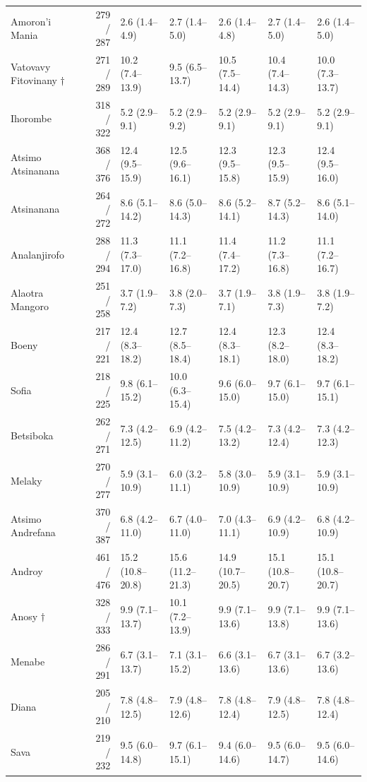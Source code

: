 \documentclass[11pt,a4paper]{article}
\begin{document}
\begin{landscape}
\begin{longtable}{l|rlllll}
Amoron'i Mania & 279 / 287 & 2.6 (1.4–4.9) & 2.7 (1.4–5.0) & 2.6 (1.4–4.8) & 2.7 (1.4–5.0) & 2.6 (1.4–5.0) \\ 
Vatovavy Fitovinany $\dagger$ & 271 / 289 & 10.2 (7.4–13.9) & 9.5 (6.5–13.7) & 10.5 (7.5–14.4) & 10.4 (7.4–14.3) & 10.0 (7.3–13.7) \\ 
Ihorombe & 318 / 322 & 5.2 (2.9–9.1) & 5.2 (2.9–9.2) & 5.2 (2.9–9.1) & 5.2 (2.9–9.1) & 5.2 (2.9–9.1) \\ 
Atsimo Atsinanana & 368 / 376 & 12.4 (9.5–15.9) & 12.5 (9.6–16.1) & 12.3 (9.5–15.8) & 12.3 (9.5–15.9) & 12.4 (9.5–16.0) \\ 
Atsinanana & 264 / 272 & 8.6 (5.1–14.2) & 8.6 (5.0–14.3) & 8.6 (5.2–14.1) & 8.7 (5.2–14.3) & 8.6 (5.1–14.0) \\ 
Analanjirofo & 288 / 294 & 11.3 (7.3–17.0) & 11.1 (7.2–16.8) & 11.4 (7.4–17.2) & 11.2 (7.3–16.8) & 11.1 (7.2–16.7) \\ 
Alaotra Mangoro & 251 / 258 & 3.7 (1.9–7.2) & 3.8 (2.0–7.3) & 3.7 (1.9–7.1) & 3.8 (1.9–7.3) & 3.8 (1.9–7.2) \\ 
Boeny & 217 / 221 & 12.4 (8.3–18.2) & 12.7 (8.5–18.4) & 12.4 (8.3–18.1) & 12.3 (8.2–18.0) & 12.4 (8.3–18.2) \\ 
Sofia & 218 / 225 & 9.8 (6.1–15.2) & 10.0 (6.3–15.4) & 9.6 (6.0–15.0) & 9.7 (6.1–15.0) & 9.7 (6.1–15.1) \\ 
Betsiboka & 262 / 271 & 7.3 (4.2–12.5) & 6.9 (4.2–11.2) & 7.5 (4.2–13.2) & 7.3 (4.2–12.4) & 7.3 (4.2–12.3) \\ 
Melaky & 270 / 277 & 5.9 (3.1–10.9) & 6.0 (3.2–11.1) & 5.8 (3.0–10.9) & 5.9 (3.1–10.9) & 5.9 (3.1–10.9) \\ 
Atsimo Andrefana & 370 / 387 & 6.8 (4.2–11.0) & 6.7 (4.0–11.0) & 7.0 (4.3–11.1) & 6.9 (4.2–10.9) & 6.8 (4.2–10.9) \\ 
Androy & 461 / 476 & 15.2 (10.8–20.8) & 15.6 (11.2–21.3) & 14.9 (10.7–20.5) & 15.1 (10.8–20.7) & 15.1 (10.8–20.7) \\ 
Anosy $\dagger$ & 328 / 333 & 9.9 (7.1–13.7) & 10.1 (7.2–13.9) & 9.9 (7.1–13.6) & 9.9 (7.1–13.8) & 9.9 (7.1–13.6) \\ 
Menabe & 286 / 291 & 6.7 (3.1–13.7) & 7.1 (3.1–15.2) & 6.6 (3.1–13.6) & 6.7 (3.1–13.6) & 6.7 (3.2–13.6) \\ 
Diana & 205 / 210 & 7.8 (4.8–12.5) & 7.9 (4.8–12.6) & 7.8 (4.8–12.4) & 7.9 (4.8–12.5) & 7.8 (4.8–12.4) \\ 
Sava & 219 / 232 & 9.5 (6.0–14.8) & 9.7 (6.1–15.1) & 9.4 (6.0–14.6) & 9.5 (6.0–14.7) & 9.5 (6.0–14.6) \\ 

\end{longtable}
\end{landscape}
\end{document}
